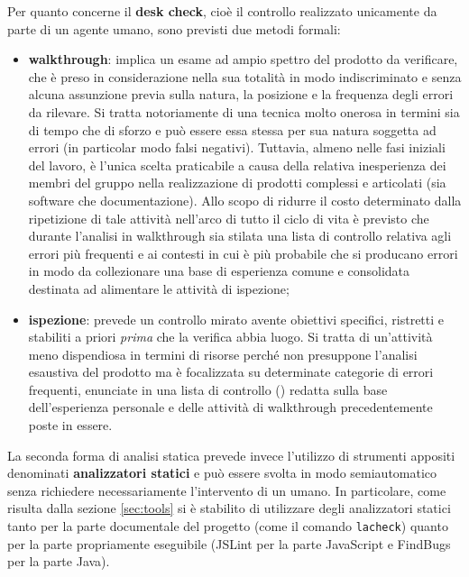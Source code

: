Per quanto concerne il \textbf{desk check}, cioè il controllo realizzato unicamente da parte di un agente umano, sono previsti due metodi formali:
\begin{itemize}
  \item \textbf{walkthrough}: implica un esame ad ampio spettro del prodotto da verificare, che è preso in considerazione nella sua totalità in modo indiscriminato e senza alcuna assunzione previa sulla natura, la posizione e la frequenza degli errori da rilevare. Si tratta notoriamente di una tecnica molto onerosa in termini sia di tempo che di sforzo e può essere essa stessa per sua natura soggetta ad errori (in particolar modo falsi negativi). Tuttavia, almeno nelle fasi iniziali del lavoro, è l'unica scelta praticabile a causa della relativa inesperienza dei membri del gruppo nella realizzazione di prodotti complessi e articolati (sia software che documentazione). Allo scopo di ridurre il costo determinato dalla ripetizione di tale attività nell'arco di tutto il ciclo di vita è previsto che durante l'analisi in walkthrough sia stilata una lista di controllo relativa agli errori più frequenti e ai contesti in cui è più probabile che si producano errori in modo da collezionare una base di esperienza comune e consolidata destinata ad alimentare le attività di ispezione;
  \item \textbf{ispezione}: prevede un controllo mirato avente obiettivi specifici, ristretti e stabiliti a priori \emph{prima} che la verifica abbia luogo. Si tratta di un'attività meno dispendiosa in termini di risorse perché non presuppone l'analisi esaustiva del prodotto ma è focalizzata su determinate categorie di errori frequenti, enunciate in una lista di controllo () redatta sulla base dell'esperienza personale e delle attività di walkthrough precedentemente poste in essere.
\end{itemize}

La seconda forma di analisi statica prevede invece l'utilizzo di strumenti appositi denominati \textbf{analizzatori statici} e può essere svolta in modo semiautomatico senza richiedere necessariamente l'intervento di un umano. In particolare, come risulta dalla sezione \ref{sec:tools} si è stabilito di utilizzare degli analizzatori statici tanto per la parte documentale del progetto (come il comando \texttt{lacheck}) quanto per la parte propriamente eseguibile (JSLint per la parte JavaScript e FindBugs per la parte Java).

